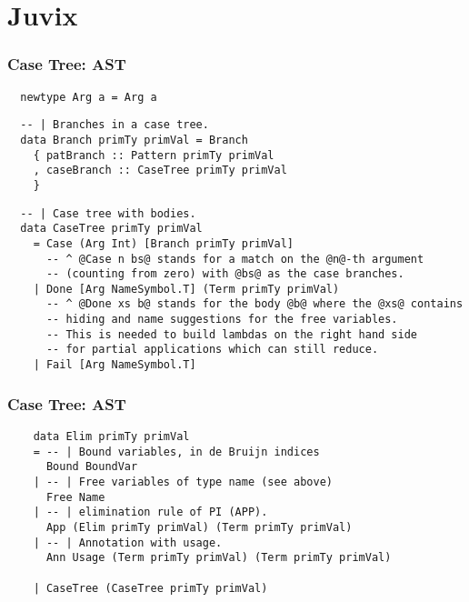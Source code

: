 \documentclass[10pt, xelatex, hyperref={pdfpagelabels=false,breaklinks}]{beamer}
\begin{document}
\section{Juvix}
\begin{frame}[fragile]
  \frametitle{Case Tree: AST}

  \begin{verbatim}
  newtype Arg a = Arg a
  \end{verbatim}

  \begin{verbatim}
  -- | Branches in a case tree.
  data Branch primTy primVal = Branch 
    { patBranch :: Pattern primTy primVal
    , caseBranch :: CaseTree primTy primVal
    }
  \end{verbatim}


  \begin{verbatim}
  -- | Case tree with bodies.
  data CaseTree primTy primVal
    = Case (Arg Int) [Branch primTy primVal]
      -- ^ @Case n bs@ stands for a match on the @n@-th argument
      -- (counting from zero) with @bs@ as the case branches.
    | Done [Arg NameSymbol.T] (Term primTy primVal)
      -- ^ @Done xs b@ stands for the body @b@ where the @xs@ contains
      -- hiding and name suggestions for the free variables. 
      -- This is needed to build lambdas on the right hand side 
      -- for partial applications which can still reduce.
    | Fail [Arg NameSymbol.T]
  \end{verbatim}
\end{frame}

\begin{frame}[fragile]
  \frametitle{Case Tree: AST}

  \begin{verbatim}
    data Elim primTy primVal
    = -- | Bound variables, in de Bruijn indices
      Bound BoundVar
    | -- | Free variables of type name (see above)
      Free Name
    | -- | elimination rule of PI (APP).
      App (Elim primTy primVal) (Term primTy primVal)
    | -- | Annotation with usage.
      Ann Usage (Term primTy primVal) (Term primTy primVal)
    
    | CaseTree (CaseTree primTy primVal)
  \end{verbatim}

\end{frame}
\end{document}
